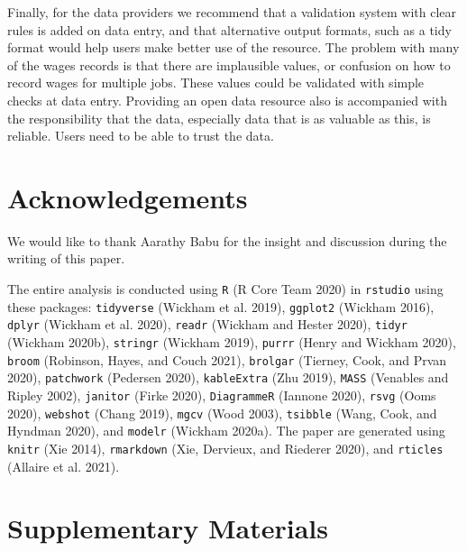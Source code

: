 \documentclass[12pt]{article}
\begin{document}
Finally, for the data providers we recommend that a validation system with clear rules is added on data entry, and that alternative output formats, such as a tidy format would help users make better use of the resource. The problem with many of the wages records is that there are implausible values, or confusion on how to record wages for multiple jobs. These values could be validated with simple checks at data entry. Providing an open data resource also is accompanied with the responsibility that the data, especially data that is as valuable as this, is reliable. Users need to be able to trust the data.

\hypertarget{acknowledgements}{%
\section{Acknowledgements}\label{acknowledgements}}

We would like to thank Aarathy Babu for the insight and discussion during the writing of this paper.

The entire analysis is conducted using \texttt{R} (R Core Team 2020) in \texttt{rstudio} using these packages: \texttt{tidyverse} (Wickham et al. 2019), \texttt{ggplot2} (Wickham 2016), \texttt{dplyr} (Wickham et al. 2020), \texttt{readr} (Wickham and Hester 2020), \texttt{tidyr} (Wickham 2020b), \texttt{stringr} (Wickham 2019), \texttt{purrr} (Henry and Wickham 2020), \texttt{broom} (Robinson, Hayes, and Couch 2021), \texttt{brolgar} (Tierney, Cook, and Prvan 2020), \texttt{patchwork} (Pedersen 2020), \texttt{kableExtra} (Zhu 2019), \texttt{MASS} (Venables and Ripley 2002), \texttt{janitor} (Firke 2020), \texttt{DiagrammeR} (Iannone 2020), \texttt{rsvg} (Ooms 2020), \texttt{webshot} (Chang 2019), \texttt{mgcv} (Wood 2003), \texttt{tsibble} (Wang, Cook, and Hyndman 2020), and \texttt{modelr} (Wickham 2020a). The paper are generated using \texttt{knitr} (Xie 2014), \texttt{rmarkdown} (Xie, Dervieux, and Riederer 2020), and \texttt{rticles} (Allaire et al. 2021).

\hypertarget{supplementary-materials}{%
\section{Supplementary Materials}\label{supplementary-materials}}
\end{document}

